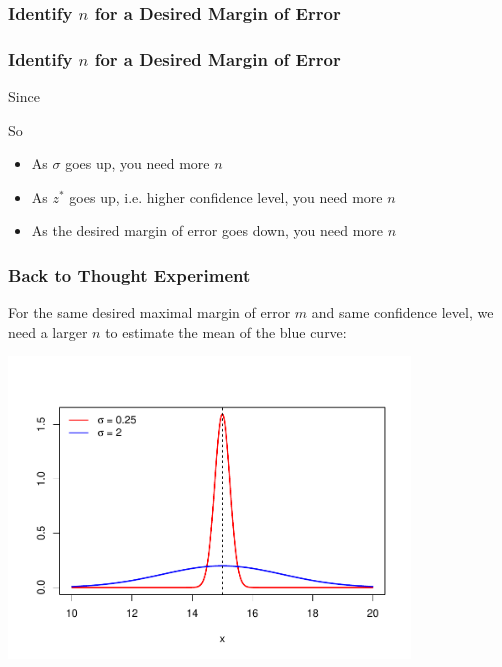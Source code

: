 \documentclass[handout]{beamer}
\begin{document}
\begin{frame}
\frametitle{Identify $n$ for a Desired Margin of Error}
\end{frame}


\begin{frame}
\frametitle{Identify $n$ for a Desired Margin of Error}
Since

\vspace{3cm}

\pause So
\begin{itemize}
\pause\item As $\sigma$ goes up, you need more $n$
\pause\item As $z^*$ goes up, i.e. higher confidence level, you need more $n$
\pause\item As the desired margin of error goes down, you need more $n$
\end{itemize}

\end{frame}


\begin{frame}
\frametitle{Back to Thought Experiment}
For the same desired maximal margin of error $m$ and same confidence level, we need a larger $n$ to estimate the mean of the blue curve:
\begin{center}
\includegraphics[width=0.8\textwidth]{figure/norm.pdf}
\end{center}
\end{frame}
\end{document}
